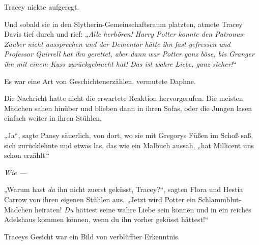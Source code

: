 Tracey nickte aufgeregt.

Und sobald sie in den Slytherin-Gemeinschaftsraum platzten, atmete Tracey Davis tief durch und rief:
„\emph{Alle herhören! Harry Potter konnte den Patronus-Zauber nicht aussprechen und der Dementor hätte ihn fast gefressen und Professor Quirrell hat ihn gerettet, aber dann war Potter ganz böse, bis Granger ihn mit einem Kuss zurückgebracht hat! Das ist wahre Liebe, ganz sicher!}“

Es war eine Art von Geschichtenerzählen, vermutete Daphne.

Die Nachricht hatte nicht die erwartete Reaktion hervorgerufen. Die meisten Mädchen sahen hinüber und blieben dann in ihren Sofas, oder die Jungen lasen einfach weiter in ihren Stühlen.

„Ja“, sagte Pansy säuerlich, von dort, wo sie mit Gregorys Füßen im Schoß saß, sich zurücklehnte und etwas las, das wie ein Malbuch aussah, „hat Millicent uns schon erzählt.“

\emph{Wie —}

„Warum hast \emph{du} ihn nicht zuerst geküsst, Tracey?“, sagten Flora und Hestia Carrow von ihren eigenen Stühlen aus.
„Jetzt wird Potter ein Schlammblut-Mädchen heiraten! \emph{Du} hättest seine wahre Liebe sein können und in ein reiches Adelshaus kommen können, wenn du ihn vorher geküsst hättest!“

Traceys Gesicht war ein Bild von verblüffter Erkenntnis.

